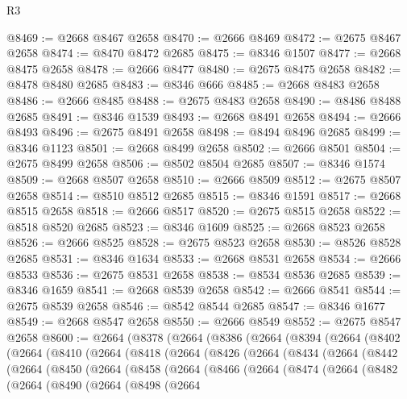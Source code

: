 \begin{lexlean}{R3}
\begin{coremodule}
@8469 := @2668 @8467 @2658
@8470 := @2666 @8469
@8472 := @2675 @8467 @2658
@8474 := @8470 @8472 @2685
@8475 := @8346 @1507
@8477 := @2668 @8475 @2658
@8478 := @2666 @8477
@8480 := @2675 @8475 @2658
@8482 := @8478 @8480 @2685
@8483 := @8346 @666
@8485 := @2668 @8483 @2658
@8486 := @2666 @8485
@8488 := @2675 @8483 @2658
@8490 := @8486 @8488 @2685
@8491 := @8346 @1539
@8493 := @2668 @8491 @2658
@8494 := @2666 @8493
@8496 := @2675 @8491 @2658
@8498 := @8494 @8496 @2685
@8499 := @8346 @1123
@8501 := @2668 @8499 @2658
@8502 := @2666 @8501
@8504 := @2675 @8499 @2658
@8506 := @8502 @8504 @2685
@8507 := @8346 @1574
@8509 := @2668 @8507 @2658
@8510 := @2666 @8509
@8512 := @2675 @8507 @2658
@8514 := @8510 @8512 @2685
@8515 := @8346 @1591
@8517 := @2668 @8515 @2658
@8518 := @2666 @8517
@8520 := @2675 @8515 @2658
@8522 := @8518 @8520 @2685
@8523 := @8346 @1609
@8525 := @2668 @8523 @2658
@8526 := @2666 @8525
@8528 := @2675 @8523 @2658
@8530 := @8526 @8528 @2685
@8531 := @8346 @1634
@8533 := @2668 @8531 @2658
@8534 := @2666 @8533
@8536 := @2675 @8531 @2658
@8538 := @8534 @8536 @2685
@8539 := @8346 @1659
@8541 := @2668 @8539 @2658
@8542 := @2666 @8541
@8544 := @2675 @8539 @2658
@8546 := @8542 @8544 @2685
@8547 := @8346 @1677
@8549 := @2668 @8547 @2658
@8550 := @2666 @8549
@8552 := @2675 @8547 @2658
@8600 := @2664
    (@8378
      (@2664
        (@8386
          (@2664
            (@8394
              (@2664
                (@8402
                  (@2664
                    (@8410
                      (@2664
                        (@8418
                          (@2664
                            (@8426
                              (@2664
                                (@8434
                                  (@2664
                                    (@8442
                                      (@2664
                                        (@8450
                                          (@2664
                                            (@8458
                                              (@2664
                                                (@8466
                                                  (@2664
                                                    (@8474
                                                      (@2664
                                                        (@8482
                                                          (@2664
                                                            (@8490
                                                              (@2664
                                                                (@8498
                                                                  (@2664

\end{coremodule}
\end{lexlean}
